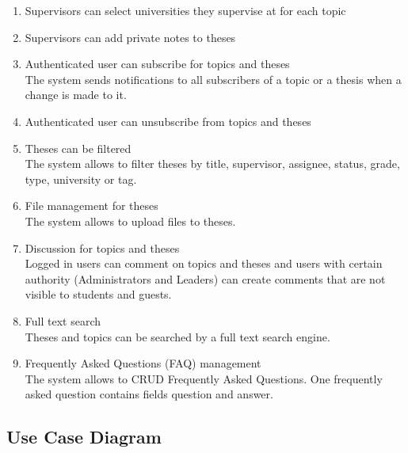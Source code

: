 \begin{enumerate}
    \item Supervisors can select universities they supervise at for each topic

    \item Supervisors can add private notes to theses

    \item Authenticated user can subscribe for topics and theses\\
    The system sends notifications to all subscribers of a topic or a thesis when a change is made to it.

    \item Authenticated user can unsubscribe from topics and theses

    \item Theses can be filtered\\
    The system allows to filter theses by title, supervisor, assignee, status, grade, type, university or tag.

    \item File management for theses\\
    The system allows to upload files to theses.

    \item Discussion for topics and theses\\
    Logged in users can comment on topics and theses and users with certain authority (Administrators and Leaders) can create comments that are not visible to students and guests.

    \item Full text search\\
    Theses and topics can be searched by a full text search engine.

    \item Frequently Asked Questions (FAQ) management\\
    The system allows to CRUD Frequently Asked Questions. One frequently asked question contains fields question and answer.

\end{enumerate}

\subsection{Use Case Diagram}

